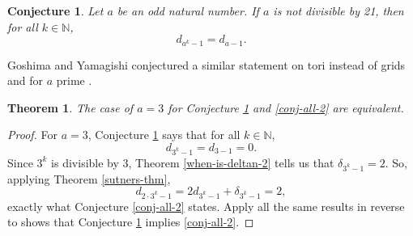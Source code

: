\documentclass[a4paper]{article}
\newtheorem{theorem}{Theorem}[section]
\newtheorem{conjecture}{Conjecture}
\newcommand{\N}{\mathbb{N}}
\begin{document}
	\begin{conjecture}\label{conj-powers}
		Let $a$ be an odd natural number.
		If $a$ is not divisible by 21, then for all $k \in \N$,
		\begin{equation*}
			d_{a^k - 1} = d_{a-1}.
		\end{equation*}
	\end{conjecture}
	Goshima and Yamagishi conjectured a similar statement on tori instead of grids and for $a$ prime \cite{GOSHIMAYAMAGISHI2010}.
	
	\begin{theorem}
		The case of $a=3$ for Conjecture \ref{conj-powers} and \ref{conj-all-2} are equivalent.
	\end{theorem}
	\begin{proof}
		For $a=3$, Conjecture \ref{conj-powers} says that for all $k \in \N$,
		\begin{equation*}
			d_{3^k - 1} = d_{3-1} = 0.
		\end{equation*}
		Since $3^k$ is divisible by 3, Theorem \ref{when-is-deltan-2} tells us that $\delta_{3^k - 1} = 2$.
		So, applying Theorem \ref{sutners-thm},
		\begin{equation*}
			d_{2\cdot3^{k} - 1} = 2d_{3^k - 1} + \delta_{3^k - 1} = 2,
		\end{equation*}
		exactly what Conjecture \ref{conj-all-2} states.
		Apply all the same results in reverse to shows that Conjecture \ref{conj-powers} implies \ref{conj-all-2}.
	\end{proof}
	
	\newpage
	
	
\end{document}
